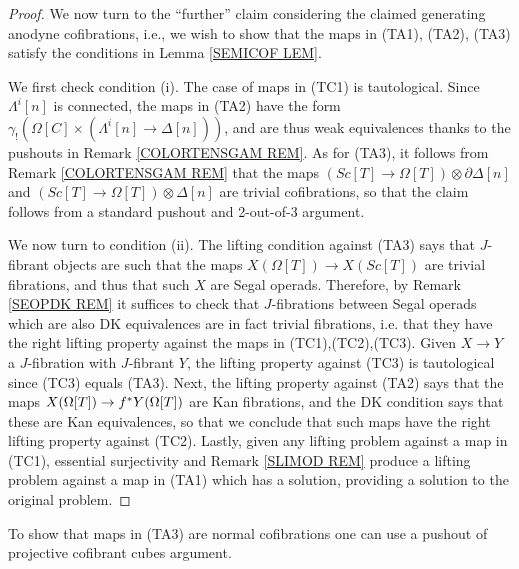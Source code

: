 \documentclass[a4paper,10pt
,draft
]{article}%
\renewcommand{\1}{\ensuremath{\mathbb{id}}}
\begin{document}
\begin{proof}
We now turn to the ``further'' claim considering the claimed generating anodyne cofibrations, i.e., 
we wish to show that the maps in 
(TA1), (TA2), (TA3) satisfy the conditions in
Lemma \ref{SEMICOF LEM}.

We first check condition (i).
The case of maps in (TC1) is tautological.
Since $\Lambda^{i}[n]$ is connected, 
the maps in (TA2) have the form
$\gamma_{!} 
\left( \Omega[C] \times
\left( \Lambda^i[n] \to \Delta[n] \right) \right)$,
and are thus weak equivalences thanks to the pushouts
in Remark \ref{COLORTENSGAM REM}.
As for (TA3), it follows from Remark \ref{COLORTENSGAM REM}
that the maps
$\left( Sc[T] \to \Omega[T] \right) \otimes \partial \Delta[n]$
and 
$\left( Sc[T] \to \Omega[T] \right) \otimes \Delta[n]$
are trivial cofibrations, so that the claim follows from a standard pushout and 2-out-of-3 argument.

We now turn to condition (ii).
The lifting condition against (TA3) says that $J$-fibrant objects are such that the maps $X(\Omega[T]) \to X(Sc[T])$
are trivial fibrations, and thus that such $X$ are Segal operads.
Therefore, by Remark \ref{SEOPDK REM} it suffices to check that $J$-fibrations between Segal operads which are also DK equivalences are in fact trivial fibrations, i.e. that they have the right lifting property against the maps in (TC1),(TC2),(TC3).
Given $X \to Y$ a $J$-fibration with $J$-fibrant $Y$,
the lifting property against (TC3) is tautological since 
(TC3) equals (TA3).
Next, the lifting property against (TA2) says that the maps
$X(\Omega[T]) \to f^{\**} Y(\Omega[T])$
are Kan fibrations, and the DK condition says that these are Kan equivalences,
so that we conclude that such maps have the right lifting property against (TC2).
Lastly, given any lifting problem against a map in (TC1),
essential surjectivity and Remark \ref{SLIMOD REM}
produce a lifting problem against a map in (TA1) which has a solution, providing a solution to the original problem.
\end{proof}




{\color{red} To show that maps in (TA3) are normal cofibrations one can use a pushout of projective cofibrant cubes argument.}


{}




\end{document}
